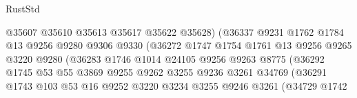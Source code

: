 \begin{lexlean}{RustStd}
\begin{coremodule}
                                      @35607
                                      @35610
                                      @35613
                                      @35617
                                      @35622
                                      @35628)
                                    (@36337
                                      @9231
                                      @1762
                                      @1784
                                      @13
                                      @9256
                                      @9280
                                      @9306
                                      @9330
                                      (@36272
                                        @1747
                                        @1754
                                        @1761
                                        @13
                                        @9256
                                        @9265
                                        @3220
                                        @9280
                                        (@36283
                                          @1746
                                          @1014
                                          @24105
                                          @9256
                                          @9263
                                          @8775
                                          (@36292
                                            @1745
                                            @53
                                            @55
                                            @3869
                                            @9255
                                            @9262
                                            @3255
                                            @9236
                                            @3261
                                            @34769
                                            (@36291
                                              @1743
                                              @103
                                              @53
                                              @16
                                              @9252
                                              @3220
                                              @3234
                                              @3255
                                              @9246
                                              @3261
                                              (@34729
                                                @1742

\end{coremodule}
\end{lexlean}
